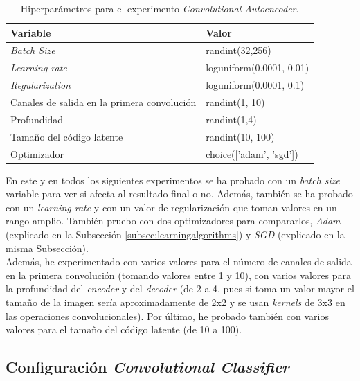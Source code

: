 \begin{table}[H]
\centering
\begin{tabular}{m{4cm}m{5.1cm}}
\hline
\textbf{Variable}                 & \textbf{Valor}                          \\ \hline
\textit{Batch Size}               & randint(32,256)                         \\
\textit{Learning rate}            & loguniform(0.0001, 0.01)                \\
\textit{Regularization}           & loguniform(0.0001, 0.1)                 \\
Canales de salida en la primera convolución &   randint(1, 10)              \\
Profundidad                       & randint(1,4)                            \\
Tamaño del código latente         & randint(10, 100)                        \\
Optimizador                       & choice(['adam', 'sgd'])                 \\ \hline
\end{tabular}
\caption{Hiperparámetros para el experimento \textit{Convolutional Autoencoder}.}
\label{tab:caeconfig}
\end{table}

En este y en todos los siguientes experimentos se ha probado con un \textit{batch size} variable para ver si afecta al resultado final o no. Además, también se ha probado con un \textit{learning rate} y con un valor de regularización que toman valores en un rango amplio. También pruebo con dos optimizadores para compararlos, \textit{Adam} (explicado en la Subsección \ref{subsec:learningalgorithms}) y \textit{SGD} (explicado en la misma Subsección).\\

Además, he experimentado con varios valores para el número de canales de salida en la primera convolución (tomando valores entre 1 y 10), con varios valores para la profundidad del \textit{encoder} y del \textit{decoder} (de 2 a 4, pues si toma un valor mayor el tamaño de la imagen sería aproximadamente de 2x2 y se usan \textit{kernels} de 3x3 en las operaciones convolucionales). Por último, he probado también con varios valores para el tamaño del código latente (de 10 a 100).\\

\subsection{Configuración \textit{Convolutional Classifier}}

